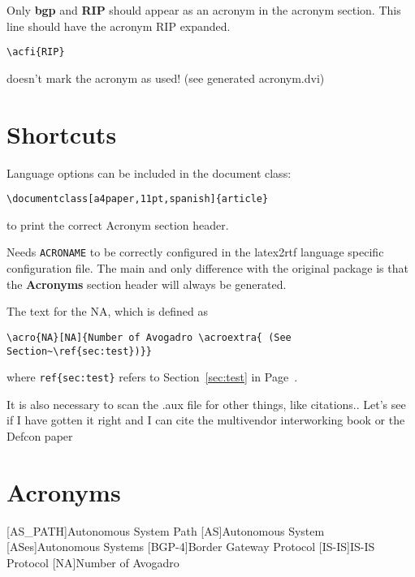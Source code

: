\documentclass[a4paper,11pt]{article}
\begin{document}
Only \textbf{\ac{bgp}} and \textbf{\ac{RIP}} should appear as an
acronym in the acronym section. This line should have the acronym
\ac{RIP} expanded. 
\begin{verbatim}
\acfi{RIP}
\end{verbatim}
doesn't mark the acronym as used! (see generated acronym.dvi)

\section{Shortcuts}
\label{sec:shortcut}

Language options can be included in the document class:
\begin{verbatim}
\documentclass[a4paper,11pt,spanish]{article}
\end{verbatim}
to print the correct Acronym section header. 

Needs \texttt{ACRONAME} to be correctly configured in the latex2rtf
language specific configuration file. The main and only difference with
the original package is that the \textbf{Acronyms} section header will
always be generated.

The text for the \ac{NA}, which is defined as
\begin{verbatim}
\acro{NA}[NA]{Number of Avogadro \acroextra{ (See Section~\ref{sec:test})}}
\end{verbatim}
where \texttt{ref\{sec:test\}} refers to Section~\ref{sec:test} in
Page~\pageref{sec:test}.

It is also necessary to scan the .aux file for other things, like
citations.. Let's see if I have gotten it right and I can cite the
multivendor interworking book \cite{Goralski-cisco-juniper} or the
Defcon paper \cite{defcon16-bgp}

\section*{Acronyms}
\begin{acronym}[BGP-4]
[AS\_PATH]{Autonomous System Path}
[AS]{Autonomous System}
[ASes]{Autonomous Systems}
[BGP-4]{Border Gateway Protocol}
[IS-IS]{IS-IS Protocol}
[NA]{Number of Avogadro }
\end{acronym}



\end{document}
